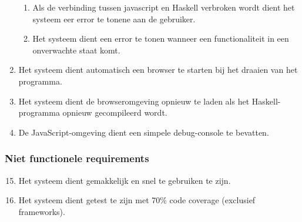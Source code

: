 \begin{enumerate}[{R}1]
	\begin{enumerate}[{R8.}1]
		\item Als de verbinding tussen javascript en Haskell verbroken wordt dient het systeem eer error te tonene aan de gebruiker. 
		\item Het systeem dient een error te tonen wanneer een functionaliteit in een onverwachte staat komt.
	\end{enumerate}
	\item Het systeem dient automatisch een browser te starten bij het draaien van het programma.
	\item Het systeem dient de browseromgeving opnieuw te laden als het Haskell-programma opnieuw gecompileerd wordt.
	\item De JavaScript-omgeving dient een simpele debug-console te bevatten.

\end{enumerate}

\subsubsection{Niet functionele requirements}
\begin{enumerate}[{R}1]
\setcounter{enumi}{14}
	\item Het systeem dient gemakkelijk en snel te gebruiken te zijn.
	\item Het systeem dient getest te zijn met 70\% code coverage (exclusief frameworks).
\end{enumerate}